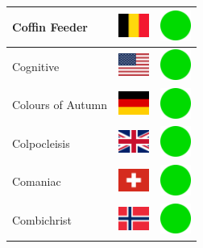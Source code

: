 \documentclass[12pt, a4paper, twoside]{report}
\begin{document}
\begin{center}
\begin{longtable}{|p{5cm}|p{2cm}|p{2cm}|}
 Coffin Feeder                                              & \includegraphics[width=1cm]{../4x3/be} &   \includegraphics[width=1cm]{../likes/y} \\ \hline
 Cognitive                                                  & \includegraphics[width=1cm]{../4x3/us} &   \includegraphics[width=1cm]{../likes/y} \\ \hline
 Colours of Autumn                                          & \includegraphics[width=1cm]{../4x3/de} &   \includegraphics[width=1cm]{../likes/y} \\ \hline
 Colpocleisis                                               & \includegraphics[width=1cm]{../4x3/gb} &   \includegraphics[width=1cm]{../likes/y} \\ \hline
 Comaniac                                                   & \includegraphics[width=1cm]{../4x3/ch} &   \includegraphics[width=1cm]{../likes/y} \\ \hline
 Combichrist                                                & \includegraphics[width=1cm]{../4x3/no} &   \includegraphics[width=1cm]{../likes/y} \\ \hline

\end{longtable}
\end{center}
\end{document}

